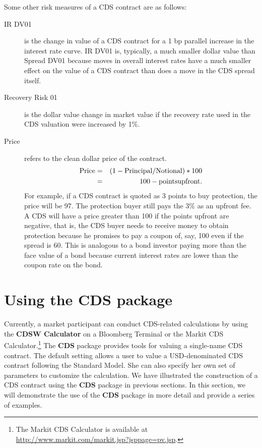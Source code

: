 \documentclass[a4paper]{article}
\begin{document}
Some other risk measures of a CDS contract are as follows:
\begin{description}
\item[IR DV01] is the change in value of a CDS contract for a 1 bp
  parallel increase in the interest rate curve. IR DV01 is, typically,
  a much smaller dollar value than Spread DV01 because moves in
  overall interest rates have a much smaller effect on the value of a
  CDS contract than does a move in the CDS spread itself.
\item [Recovery Risk 01] is the dollar value change in market value if
  the recovery rate used in the CDS valuation were increased by 1\%.
\item[Price] refers to the clean dollar price of the contract. 
  \begin{eqnarray}
    {\rm Price} & = & (1 - {\rm Principal} / {\rm Notional})*100  \nonumber \\
    & = & 100 - {\rm points upfront}. \nonumber
  \end{eqnarray}
  For example, if a CDS contract is quoted as 3 points to buy
  protection, the price will be 97. The protection buyer still pays
  the 3\% as an upfront fee. A CDS will have a price greater than 100
  if the points upfront are negative, that is, the CDS buyer needs to
  receive money to obtain protection because he promises to pay a
  coupon of, say, 100 even if the spread is 60. This is analogous to a
  bond investor paying more than the face value of a bond because
  current interest rates are lower than the coupon rate on the bond.
\end{description}


\section{Using the CDS package}
Currently, a market participant can conduct CDS-related calculations
by using the \textbf{CDSW Calculator} on a Bloomberg Terminal or the
Markit CDS Calculator.\footnote{The Markit CDS Calculator is available
  at \url{http://www.markit.com/markit.jsp?jsppage=pv.jsp}.} The
\textbf{CDS} package provides tools for valuing a single-name CDS
contract. The default setting allows a user to value a USD-denominated
CDS contract following the Standard Model. She can also specify her
own set of parameters to customize the calculation. We have
illustrated the construction of a CDS contract using the \textbf{CDS}
package in previous sections. In this section, we will demonstrate the
use of the \textbf{CDS} package in more detail and provide a series of
examples.
\end{document}
